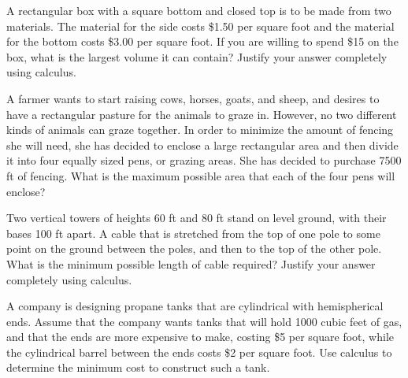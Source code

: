 \begin{exercises} 
	\item A rectangular box with a square bottom and closed top is to be made from two materials.  The material for the side costs \$1.50 per square foot and the material for the bottom costs \$3.00 per square foot.  If you are willing to spend \$15 on the box, what is the largest volume it can contain?  Justify your answer completely using calculus.
	\item A farmer wants to start raising cows, horses, goats, and sheep, and desires to have a rectangular pasture for the animals to graze in.  However, no two different kinds of animals can graze together.  In order to minimize the amount of fencing she will need, she has decided to enclose a large rectangular area and then divide it into four equally sized pens, or grazing areas.  She has decided to purchase 7500 ft of fencing.  What is the maximum possible area that each of the four pens will enclose?
	\item Two vertical towers of heights 60 ft and 80 ft stand on level ground, with their bases 100 ft apart.  A cable that is stretched from the top of one pole to some point on the ground between the poles, and then to the top of the other pole.   What is the minimum possible length of cable required?  Justify your answer completely using calculus.
	\item A company is designing propane tanks that are cylindrical with hemispherical ends.   Assume that the company wants tanks that will hold 1000 cubic feet of gas, and that the ends are more expensive to make, costing \$5 per square foot, while the cylindrical barrel between the ends costs \$2 per square foot.  Use calculus to determine the minimum cost to construct such a tank.
\end{exercises}
\afterexercises